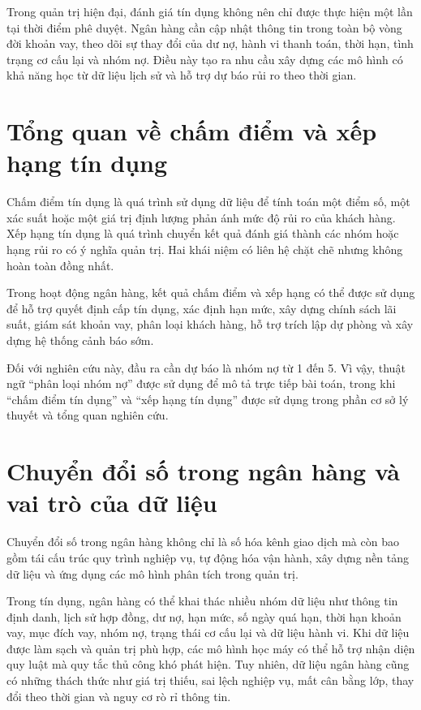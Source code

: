 Trong quản trị hiện đại, đánh giá tín dụng không nên chỉ được thực hiện một lần tại thời điểm phê duyệt. Ngân hàng cần cập nhật thông tin trong toàn bộ vòng đời khoản vay, theo dõi sự thay đổi của dư nợ, hành vi thanh toán, thời hạn, tình trạng cơ cấu lại và nhóm nợ. Điều này tạo ra nhu cầu xây dựng các mô hình có khả năng học từ dữ liệu lịch sử và hỗ trợ dự báo rủi ro theo thời gian.

\section{Tổng quan về chấm điểm và xếp hạng tín dụng}

Chấm điểm tín dụng là quá trình sử dụng dữ liệu để tính toán một điểm số, một xác suất hoặc một giá trị định lượng phản ánh mức độ rủi ro của khách hàng. Xếp hạng tín dụng là quá trình chuyển kết quả đánh giá thành các nhóm hoặc hạng rủi ro có ý nghĩa quản trị. Hai khái niệm có liên hệ chặt chẽ nhưng không hoàn toàn đồng nhất.

Trong hoạt động ngân hàng, kết quả chấm điểm và xếp hạng có thể được sử dụng để hỗ trợ quyết định cấp tín dụng, xác định hạn mức, xây dựng chính sách lãi suất, giám sát khoản vay, phân loại khách hàng, hỗ trợ trích lập dự phòng và xây dựng hệ thống cảnh báo sớm.

Đối với nghiên cứu này, đầu ra cần dự báo là nhóm nợ từ 1 đến 5. Vì vậy, thuật ngữ ``phân loại nhóm nợ'' được sử dụng để mô tả trực tiếp bài toán, trong khi ``chấm điểm tín dụng'' và ``xếp hạng tín dụng'' được sử dụng trong phần cơ sở lý thuyết và tổng quan nghiên cứu.

\section{Chuyển đổi số trong ngân hàng và vai trò của dữ liệu}

Chuyển đổi số trong ngân hàng không chỉ là số hóa kênh giao dịch mà còn bao gồm tái cấu trúc quy trình nghiệp vụ, tự động hóa vận hành, xây dựng nền tảng dữ liệu và ứng dụng các mô hình phân tích trong quản trị.

Trong tín dụng, ngân hàng có thể khai thác nhiều nhóm dữ liệu như thông tin định danh, lịch sử hợp đồng, dư nợ, hạn mức, số ngày quá hạn, thời hạn khoản vay, mục đích vay, nhóm nợ, trạng thái cơ cấu lại và dữ liệu hành vi. Khi dữ liệu được làm sạch và quản trị phù hợp, các mô hình học máy có thể hỗ trợ nhận diện quy luật mà quy tắc thủ công khó phát hiện. Tuy nhiên, dữ liệu ngân hàng cũng có những thách thức như giá trị thiếu, sai lệch nghiệp vụ, mất cân bằng lớp, thay đổi theo thời gian và nguy cơ rò rỉ thông tin.

